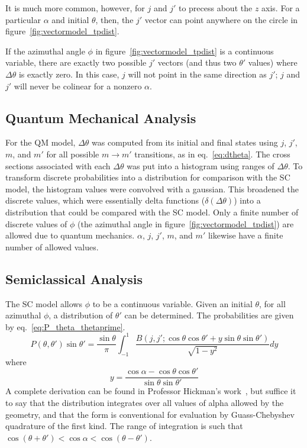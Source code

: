 \documentclass[letterpaper,titlepage,12pt]{article}
\begin{document}
It is much more common, however, for $j$ and $j'$ to precess about the $z$
axis.  For a particular $\alpha$ and initial $\theta$, then, the $j'$ vector
can point anywhere on the circle in figure~\ref{fig:vectormodel_tpdist}.

If the azimuthal angle $\phi$ in figure~\ref{fig:vectormodel_tpdist} is a
continuous variable, there are exactly two possible $j'$ vectors (and thus two
$\theta'$ values) where $\Delta\theta$ is exactly zero.  In this case,
$j$ will not point in the same direction as $j'$; $j$ and $j'$ will
never be colinear for a nonzero $\alpha$.

\subsection{Quantum Mechanical Analysis}
For the QM model, $\Delta\theta$ was computed from its initial and final states
using $j$, $j'$, $m$, and $m'$ for all possible $m\rightarrow m'$ transitions,
as in eq.~\ref{eq:dtheta}.  The cross sections associated with each
$\Delta\theta$ was put into a histogram using ranges of $\Delta\theta$.  To
transform discrete probabilities into a distribution for comparison with the SC
model, the histogram values were convolved with a gaussian.  This broadened the
discrete values, which were essentially delta functions
($\delta\left(\Delta\theta\right)$) into a distribution that could be compared
with the SC model.  Only a finite number of discrete values of $\phi$ (the
azimuthal angle in figure~\ref{fig:vectormodel_tpdist}) are allowed due to
quantum mechanics. $\alpha$, $j$, $j'$, $m$, and $m'$ likewise have a finite
number of allowed values.

\subsection{Semiclassical Analysis}
The SC model allows $\phi$ to be a continuous variable.  Given an initial
$\theta$, for all azimuthal $\phi$, a distribution of $\theta'$ can be
determined.  The probabilities are given by eq.~\ref{eq:P_theta_thetaprime}.
\begin{equation}
    P(\theta,\theta')\sin\theta'=\frac{\sin\theta}{\pi}\int_{-1}^{1}\frac{B(j,j';\cos\theta\cos\theta'+y\sin\theta\sin\theta')}{\sqrt{1-y^2}}dy
    \label{eq:P_theta_thetaprime}
\end{equation}
where
\begin{equation}
    y=\frac{\cos\alpha-\cos\theta\cos\theta'}{\sin\theta\sin\theta'}
\end{equation}
A complete derivation can be found in Professor Hickman's work~\cite{Hic15}, but suffice it to say that the
distribution integrates over all values of alpha allowed by the geometry, and
that the form is conventional for evaluation by Guass-Chebyshev quadrature of
the first kind.  The range of integration is such that
$\cos\left(\theta+\theta'\right)<\cos\alpha<\cos\left(\theta-\theta'\right)$.
\end{document}

